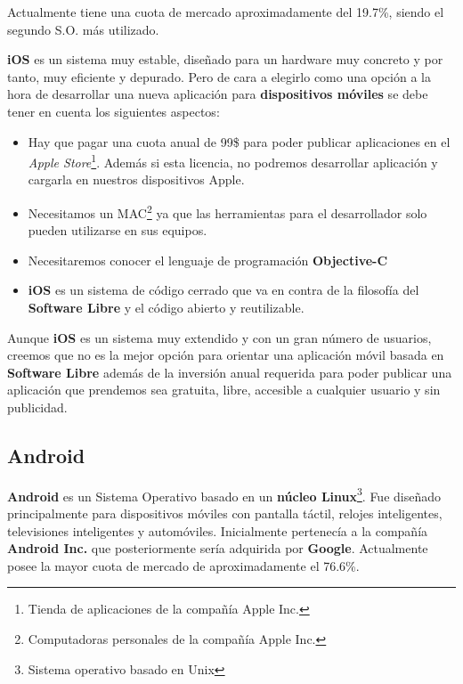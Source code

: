 \bigskip
Actualmente tiene una cuota de mercado aproximadamente del 19.7\%, siendo el segundo S.O. más utilizado.

\bigskip
\textbf{iOS} es un sistema muy estable, diseñado para un hardware muy concreto y por tanto, muy eficiente y depurado. Pero de cara a elegirlo como una opción a la hora de desarrollar una nueva aplicación para \textbf{dispositivos móviles} se debe tener en cuenta los siguientes aspectos:

\begin{itemize}
  \item Hay que pagar una cuota anual de 99\$ para poder publicar aplicaciones en el \textit{Apple Store}\footnote{Tienda de aplicaciones de la compañía Apple Inc.}. Además si esta licencia, no podremos desarrollar aplicación y cargarla en nuestros dispositivos Apple.
  \item Necesitamos un MAC\footnote{Computadoras personales de la compañía Apple Inc.} ya que las herramientas para el desarrollador solo pueden utilizarse en sus equipos.
  \item Necesitaremos conocer el lenguaje de programación \textbf{Objective-C}
  \item \textbf{iOS} es un sistema de código cerrado que va en contra de la filosofía del \textbf{Software Libre} y el código abierto y reutilizable.

\end{itemize}

\bigskip
Aunque \textbf{iOS} es un sistema muy extendido y con un gran número de usuarios, creemos que no es la mejor opción para orientar una aplicación móvil basada en \textbf{Software Libre} además de la inversión anual requerida para poder publicar una aplicación que prendemos sea gratuita, libre, accesible a cualquier usuario y sin publicidad.


\subsection{Android}

\textbf{Android} es un Sistema Operativo basado en un \textbf{núcleo Linux}\footnote{Sistema operativo basado en Unix}. Fue diseñado principalmente para dispositivos móviles con pantalla táctil, relojes inteligentes, televisiones inteligentes y automóviles. Inicialmente pertenecía a la compañía \textbf{Android Inc.} que posteriormente sería adquirida por \textbf{Google}. Actualmente posee la mayor cuota de mercado de aproximadamente el 76.6\%.

